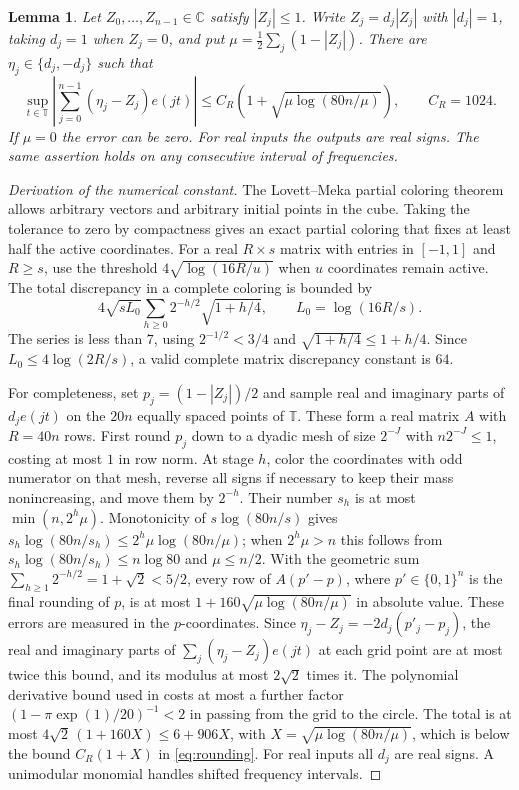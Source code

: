 \documentclass[11pt]{article}
\newtheorem{lemma}[theorem]{Lemma}
\theoremstyle{remark}
\newcommand{\C}{\mathbb C}
\newcommand{\T}{\mathbb T}
\begin{document}
\begin{lemma}\label{lem:rounding}
Let $Z_0,\ldots,Z_{n-1}\in\C$ satisfy $|Z_j|\le1$. Write
$Z_j=d_j|Z_j|$ with $|d_j|=1$, taking $d_j=1$ when $Z_j=0$, and put
$\mu=\frac12\sum_j(1-|Z_j|)$. There are $\eta_j\in\{d_j,-d_j\}$ such that
\begin{equation}\label{eq:rounding}
 \sup_{t\in\T}\left|\sum_{j=0}^{n-1}(\eta_j-Z_j)e(jt)\right|
 \le C_R\left(1+\sqrt{\mu\log(80n/\mu)}\right),\qquad C_R=1024.
\end{equation}
If $\mu=0$ the error can be zero. For real inputs the outputs are real
signs. The same assertion holds on any consecutive interval of frequencies.
\end{lemma}

\begin{proof}[Derivation of the numerical constant]
The Lovett--Meka partial coloring theorem \cite[Theorem 4]{lovettmeka}
allows arbitrary vectors and arbitrary initial points in the cube. Taking
the tolerance to zero by compactness gives an exact partial coloring that
fixes at least half the active coordinates. For a real $R\times s$ matrix
with entries in $[-1,1]$ and $R\ge s$, use the threshold
$4\sqrt{\log(16R/u)}$ when $u$ coordinates remain active. The total
discrepancy in a complete coloring is bounded by
\[
 4\sqrt{sL_0}\sum_{h\ge0}2^{-h/2}\sqrt{1+h/4},
 \qquad L_0=\log(16R/s).
\]
The series is less than $7$, using $2^{-1/2}<3/4$ and
$\sqrt{1+h/4}\le1+h/4$. Since $L_0\le4\log(2R/s)$, a valid complete
matrix discrepancy constant is $64$.

For completeness, set $p_j=(1-|Z_j|)/2$ and sample real and imaginary
parts of $d_je(jt)$ on the $20n$ equally spaced points of $\T$. These form a
real matrix $A$ with $R=40n$ rows. First round $p_j$ down to a dyadic mesh of size $2^{-J}$
with $n2^{-J}\le1$, costing at most $1$ in row norm. At stage $h$, color
the coordinates with odd numerator on that mesh, reverse all signs if
necessary to keep their mass nonincreasing, and move them by $2^{-h}$.
Their number $s_h$ is at most $\min(n,2^h\mu)$. Monotonicity of
$s\log(80n/s)$ gives $s_h\log(80n/s_h)\le2^h\mu\log(80n/\mu)$; when
$2^h\mu>n$ this follows from $s_h\log(80n/s_h)\le n\log80$ and
$\mu\le n/2$. With the geometric sum $\sum_{h\ge1}2^{-h/2}=1+\sqrt2<5/2$,
every row of $A(p'-p)$, where $p'\in\{0,1\}^n$ is the final rounding of
$p$, is at most $1+160\sqrt{\mu\log(80n/\mu)}$ in absolute value.
These errors are measured in the $p$-coordinates. Since
$\eta_j-Z_j=-2d_j(p'_j-p_j)$, the real and imaginary parts of
$\sum_j(\eta_j-Z_j)e(jt)$ at each grid point are at most twice this
bound, and its modulus at most $2\sqrt2$ times it. The polynomial
derivative bound used in \cite[Lemma 3.2]{main} costs at most a further
factor $(1-\pi\exp(1)/20)^{-1}<2$ in passing from the grid to the circle.
The total is at most $4\sqrt2\,(1+160X)\le6+906X$, with
$X=\sqrt{\mu\log(80n/\mu)}$, which is below the bound $C_R(1+X)$ in
\eqref{eq:rounding}.
For real inputs all $d_j$ are real signs. A unimodular monomial handles
shifted frequency intervals.
\end{proof}
\end{document}
